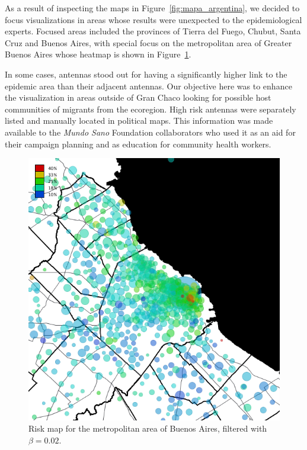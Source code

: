 As a result of inspecting the maps in Figure~\ref{fig:mapa_argentina}, we decided to 
focus visualizations in areas whose results were unexpected to the epidemiological experts. 
Focused areas included the provinces of Tierra del Fuego, Chubut, Santa Cruz and Buenos Aires, with special focus on the metropolitan area of Greater Buenos Aires whose heatmap is shown in Figure~\ref{fig:amba_map}.

In some cases, antennas stood out for having a significantly higher link to the epidemic area than their adjacent antennas. Our objective here was to enhance the visualization in areas outside of Gran Chaco looking for possible host communities of migrants from the ecoregion.
High risk antennas were separately listed and manually located in political maps. This information was made available to the \textit{Mundo Sano} Foundation collaborators who used it as an aid for their campaign planning and as education for community health workers. 


\begin{figure}[p]
\centering
\includegraphics[width=0.75\linewidth]
{figures/201112_hi_res_amba_usuarios_proporcion_circulos_beta2/201112_hi_res_amba_usuarios_proporcion_circulos_beta2}
\caption{Risk map for the metropolitan area of Buenos Aires, filtered with $\beta = 0.02$.}
\label{fig:amba_map}
\end{figure}



